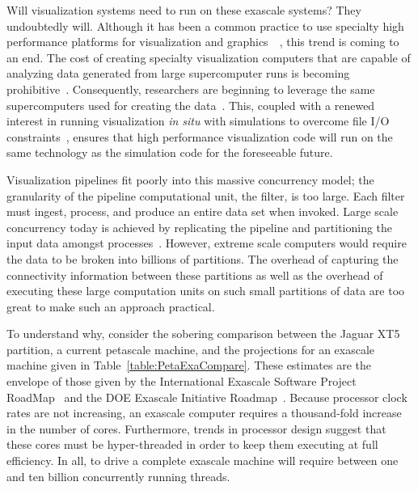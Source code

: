 \documentclass{vgtc}                          %
\newcommand*{\lcite}[1]{~\cite{#1}}
\begin{document}
Will visualization systems need to run on these exascale systems?  They
undoubtedly will.  Although it has been a common practice to use specialty
high performance platforms for visualization and graphics~\lcite{Wylie01},
this trend is coming to an end.  The cost of creating specialty
visualization computers that are capable of analyzing data generated from
large supercomputer runs is becoming prohibitive\lcite{Childs07}.
Consequently, researchers are beginning to leverage the same supercomputers
used for creating the data\lcite{Peterka09:SC,Peterka09:SciDAC,Yu08}.
This, coupled with a renewed interest in running visualization
\emph{in situ} with simulations to overcome file I/O
constraints\lcite{SNL092014,Tu06,Ross08,MaInSitu09,MaInSitu07},
ensures that high performance
visualization code will run on the same technology as the simulation code
for the foreseeable future.

Visualization pipelines fit poorly into this massive concurrency model; the
granularity of the pipeline computational unit, the filter, is too large.
Each filter must ingest, process, and produce an entire data set when
invoked.  Large scale concurrency today is achieved by replicating the
pipeline and partitioning the input data amongst processes\lcite{Ahrens00}.
However, extreme scale computers would require the data to be broken into
billions of partitions.  The overhead of capturing the connectivity
information between these partitions as well as the overhead of executing
these large computation units on such small partitions of data are too great
to make such an approach practical.

To understand why, consider the sobering comparison between the Jaguar XT5
partition, a current petascale machine, and the projections for an exascale
machine given in Table~\ref{table:PetaExaCompare}.  These estimates are the
envelope of those given by the International Exascale Software Project
RoadMap\lcite{ExascaleRoadMap} and the DOE Exascale Initiative
Roadmap\lcite{ASCACSummaryReport2010}.  Because processor clock rates are
not increasing, an exascale computer requires a thousand-fold increase in
the number of cores.  Furthermore, trends in processor design suggest that
these cores must be hyper-threaded in order to keep them executing at full
efficiency.  In all, to drive a complete exascale machine will require
between one and ten billion concurrently running threads.
\end{document}
